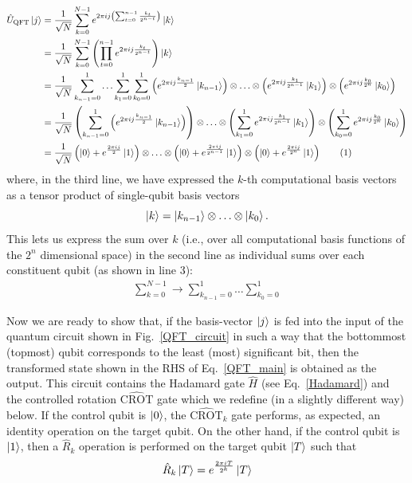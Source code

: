 \documentclass[12pt,oneside]{book}
\newcommand\numberthis{\addtocounter{equation}{1}\tag{\theequation}}
\begin{document}
\begin{align*}\label{QFT_main}
    \hat{U}_\mathrm{QFT}\ket{j} &{}= \frac{1}{\sqrt{N}} \sum_{k=0}^{N-1} e^{2\pi ij \left( \sum_{t=0}^{n-1} \frac{k_t}{2^{n-t}} \right)}\ket{k}\\
    &{} = \frac{1}{\sqrt{N}} \sum_{k=0}^{N-1} \left(\prod_{t=0}^{n-1} e^{2\pi ij \frac{k_t}{2^{n-t}}}\right) \ket{k}\\
    &{} = \frac{1}{\sqrt{N}} \sum_{k_{n-1}=0}^1 \hdots \sum_{k_1=0}^1\sum_{k_0=0}^1 \left( e^{2\pi ij \frac{k_{n-1}}{2}} \ket{k_{n-1}}\right)\otimes \hdots \otimes \left( e^{2\pi ij \frac{k_1}{2^{n-1}}} \ket{k_1}\right) \otimes \left( e^{2\pi ij \frac{k_0}{2^n}} \ket{k_0}\right)\\
    &{} = \frac{1}{\sqrt{N}} \left(\sum_{k_{n-1}=0}^1 \left( e^{2\pi ij \frac{k_{n-1}}{2}} \ket{k_{n-1}}\right) \right) \otimes \hdots \otimes \left(\sum_{k_1=0}^1 e^{2\pi ij \frac{k_1}{2^{n-1}}} \ket{k_1}\right) \otimes \left(\sum_{k_0=0}^1 e^{2\pi ij \frac{k_0}{2^n}} \ket{k_0}\right)\\
    &{} = \frac{1}{\sqrt{N}} \left(\ket{0} + e^{\frac{2\pi ij}{2}}\ket{1}\right) \otimes \hdots \otimes \left( \ket{0} + e^{\frac{2\pi i j}{2^{n-1}}}\ket{1} \right)\otimes \left(\ket{0}+e^{\frac{2\pi i j}{2^n}}\ket{1}\right)\numberthis
\end{align*}
where, in the third line, we have expressed the $k$-th computational basis vectors as a tensor product of single-qubit basis vectors $$\ket{k}=\ket{k_{n-1}}\otimes\hdots\otimes\ket{k_0}.$$ This lets us express the sum over $k$ (i.e., over all computational basis functions of the $2^n$ dimensional space) in the second line as individual sums over each constituent qubit (as shown in line 3):
\begin{align*}
    \sum_{k=0}^{N-1} \rightarrow \sum_{k_{n-1}=0}^1 \hdots \sum_{k_0=0}^1
\end{align*}

Now we are ready to show that, if the basis-vector $\ket{j}$ is fed into the input of the quantum circuit shown in Fig.~\ref{QFT_circuit} in such a way that the bottommost (topmost) qubit corresponds to the least (most) significant bit, then the transformed state shown in the RHS of Eq.~\ref{QFT_main} is obtained as the output. This circuit contains the Hadamard gate $\hat{H}$ (see Eq.~\ref{Hadamard}) and the controlled rotation $\hat{\mathrm{CROT}}$ gate which we redefine (in a slightly different way) below. If the control qubit is $\ket{0}$, the $\hat{\mathrm{CROT}}_k$ gate performs, as expected, an identity operation on the target qubit. On the other hand, if the control qubit is $\ket{1}$, then a $\hat{R}_k$ operation is performed on the target qubit $\ket{T}$ such that
\begin{align*}
\hat{R}_k\ket{T}=e^{\frac{2\pi i T}{2^k}}\ket{T}
\end{align*}
\end{document}
